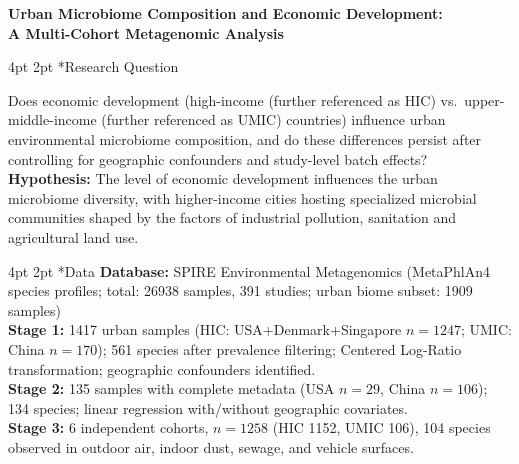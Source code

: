 \documentclass[12pt,a4paper]{article}
\makeatletter
\renewcommand\section{\@startsection{section}{1}{\z@}%
  {4pt \@plus 1pt \@minus 1pt}{2pt}%
  {\normalfont\normalsize\bfseries}}
\makeatother
\begin{document}
\begin{center}
{\large\textbf{Urban Microbiome Composition and Economic Development:\\A Multi-Cohort Metagenomic Analysis}}\\[2pt]
\end{center}

\section*{Research Question}

Does economic development (high-income (further referenced as HIC) vs.\ upper-middle-income (further referenced as UMIC) countries)
influence urban environmental microbiome composition, and do these differences persist after controlling for geographic confounders and study-level batch effects?\\
\textbf{Hypothesis:}
The level of economic development influences the urban microbiome diversity,
with higher-income cities hosting specialized microbial communities shaped by the factors of
industrial pollution, sanitation and agricultural land use.

\section*{Data}
\textbf{Database:} SPIRE Environmental Metagenomics (MetaPhlAn4 species profiles; total: 26938 samples, 391 studies; urban biome subset: 1909 samples)\\
\textbf{Stage 1:} 1417 urban samples (HIC: USA+Denmark+Singapore $n=1247$; UMIC: China $n=170$); 561 species after prevalence filtering; Centered Log-Ratio transformation; geographic confounders identified.\\
\textbf{Stage 2:} 135 samples with complete metadata (USA $n=29$, China $n=106$); 134 species; linear regression with/without geographic covariates.\\
\textbf{Stage 3:} 6 independent cohorts, $n=1258$ (HIC 1152, UMIC 106), 104 species observed in outdoor air, indoor dust, sewage, and vehicle surfaces.\\
\end{document}
